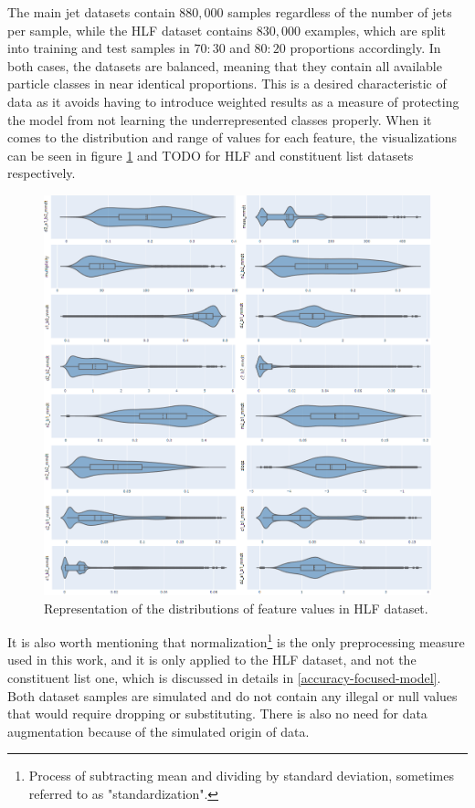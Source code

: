 The main jet datasets contain \(880,000\) samples regardless of the number of jets per sample, while the HLF dataset contains \(830,000\) examples, which are split into training and test samples in \(70:30\) and \(80:20\) proportions accordingly. In both cases, the datasets are balanced, meaning that they contain all available particle classes in near identical proportions. This is a desired characteristic of data as it avoids having to introduce weighted results as a measure of protecting the model from not learning the underrepresented classes properly. When it comes to the distribution and range of values for each feature, the visualizations can be seen in figure \ref{fig:distributions-hlf} and TODO for HLF and constituent list datasets respectively.

\begin{figure}[hpt!]
  \centering
  \includegraphics[trim={0cm 0cm 0cm 0cm}, width=1.0\textwidth, center]{background/distributions.png}
  \caption{Representation of the distributions of feature values in HLF dataset.}
  \label{fig:distributions-hlf}
\end{figure}

It is also worth mentioning that normalization\footnote{Process of subtracting mean and dividing by standard deviation, sometimes referred to as "standardization".} is the only preprocessing measure used in this work, and it is only applied to the HLF dataset, and not the constituent list one, which is discussed in details in \cref{accuracy-focused-model}. Both dataset samples are simulated and do not contain any illegal or null values that would require dropping or substituting. There is also no need for data augmentation because of the simulated origin of data.

\todofig{|}
\todofig{|}
\todofig{|}
\todofig{|}
\todofig{|}
\todofig{|}
\todofig{|}
